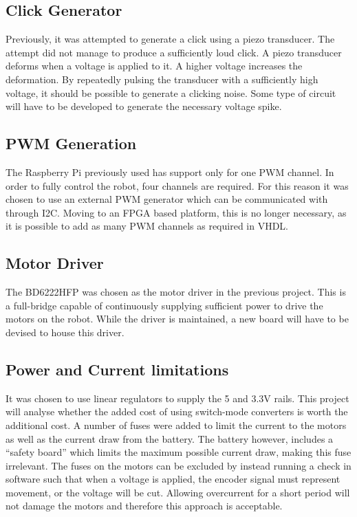 \documentclass[11pt]{article}
\begin{document}
\subsection{Click Generator} %
\label{sub:click_generator}
Previously, it was attempted to generate a click using a piezo transducer.
The attempt did not manage to produce a sufficiently loud click.
A piezo transducer deforms when a voltage is applied to it.
A higher voltage increases the deformation.
By repeatedly pulsing the transducer with a sufficiently high voltage, it should be possible to generate a clicking noise.
Some type of circuit will have to be developed to generate the necessary voltage spike.

\subsection{PWM Generation} %
\label{sub:pwm_generation}
The Raspberry Pi previously used has support only for one PWM channel.
In order to fully control the robot, four channels are required.
For this reason it was chosen to use an external PWM generator which can be communicated with through I2C.
Moving to an FPGA based platform, this is no longer necessary, as it is possible to add as many PWM channels as required in VHDL.

\subsection{Motor Driver} %
\label{sub:motor_driver}
The BD6222HFP was chosen as the motor driver in the previous project.
This is a full-bridge capable of continuously supplying sufficient power to drive the motors on the robot.
While the driver is maintained, a new board will have to be devised to house this driver.

\subsection{Power and Current limitations} %
\label{sub:power_and_current_limitations}
It was chosen to use linear regulators to supply the 5 and 3.3V rails.
This project will analyse whether the added cost of using switch-mode converters is worth the additional cost.
A number of fuses were added to limit the current to the motors as well as the current draw from the battery.
The battery however, includes a ``safety board'' which limits the maximum possible current draw, making this fuse irrelevant.
The fuses on the motors can be excluded by instead running a check in software such that when a voltage is applied, the encoder signal must represent movement, or the voltage will be cut.
Allowing overcurrent for a short period will not damage the motors and therefore this approach is acceptable.
\end{document}
